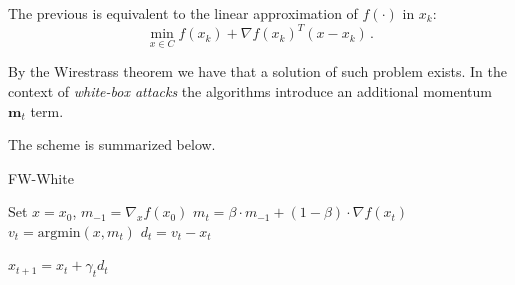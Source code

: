 \documentclass[10pt,twocolumn,letterpaper, english]{article}
\theoremstyle{definition}
\theoremstyle{plain}
\theoremstyle{plain}
\theoremstyle{plain}
\theoremstyle{plain}
\theoremstyle{remark}
\theoremstyle{remark}
\theoremstyle{definition}
\theoremstyle{definition}
\theoremstyle{definition}
\theoremstyle{definition}
\begin{document}
The previous is equivalent to the linear approximation of $f(\cdot)$ in $x_k$:
\begin{equation*}
    \min_{x \in C} f(x_k) + \nabla f(x_k)^T (x-x_k)\,.
\end{equation*}

By the Wirestrass theorem we have that a solution of such problem exists.
In the context of \textit{white-box attacks} the algorithms introduce an additional momentum $\textbf{m}_t$ term. 

The scheme is summarized below.
\begin{algorithm}
\caption{FW-White}\label{FW}
\begin{algorithmic}[1]

\State Set $x = x_0$, $m_{-1} = \nabla_x f(x_0)$
    \State $m_t = \beta \cdot m_{-1} + (1-\beta) \cdot \nabla f(x_t) $
    \State $v_t = \text{argmin} (x, m_t) $
    \State $d_t = v_t - x_t $
    
        
    \State $x_{t+1} = x_t + \gamma_t d_t $
    
    
    
\EndFor
\end{algorithmic}
\end{algorithm}
\end{document}
